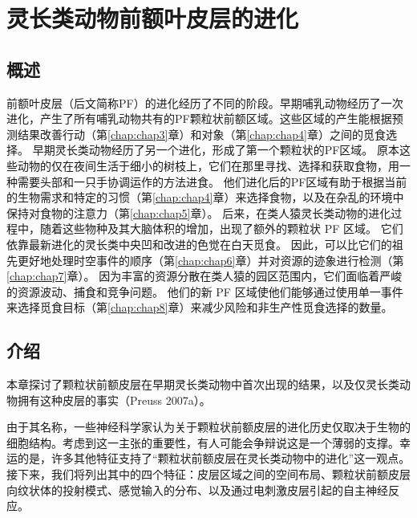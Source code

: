 \chapter{灵长类动物前额叶皮层的进化} \label{chap:chap2}

\section{概述}
前额叶皮层（后文简称PF）的进化经历了不同的阶段。早期哺乳动物经历了一次进化，产生了所有哺乳动物共有的PF颗粒状前额区域。这些区域的产生能根据预测结果改善行动（第\ref{chap:chap3}章）和对象（第\ref{chap:chap4}章）之间的觅食选择。
早期灵长类动物经历了另一个进化，形成了第一个颗粒状的PF区域。
原本这些动物的仅在夜间生活于细小的树枝上，它们在那里寻找、选择和获取食物，用一种需要头部和一只手协调运作的方法进食。
他们进化后的PF区域有助于根据当前的生物需求和特定的习惯（第\ref{chap:chap4}章）来选择食物，以及在杂乱的环境中保持对食物的注意力（第\ref{chap:chap5}章）。
后来，在类人猿灵长类动物的进化过程中，随着这些物种及其大脑体积的增加，出现了额外的颗粒状 PF 区域。
它们依靠最新进化的灵长类中央凹和改进的色觉在白天觅食。 因此，可以比它们的祖先更好地处理时空事件的顺序（第\ref{chap:chap6}章）并对资源的迹象进行检测（第\ref{chap:chap7}章）。
因为丰富的资源分散在类人猿的园区范围内，它们面临着严峻的资源波动、捕食和竞争问题。
他们的新 PF 区域使他们能够通过使用单一事件来选择觅食目标（第\ref{chap:chap8}章）来减少风险和非生产性觅食选择的数量。

\section{介绍}
本章探讨了颗粒状前额皮层在早期灵长类动物中首次出现的结果，以及仅灵长类动物拥有这种皮层的事实（Preuss 2007a）。

由于其名称，一些神经科学家认为关于颗粒状前额皮层的进化历史仅取决于生物的细胞结构。考虑到这一主张的重要性，有人可能会争辩说这是一个薄弱的支撑。幸运的是，许多其他特征支持了“颗粒状前额皮层在灵长类动物中的进化”这一观点。接下来，我们将列出其中的四个特征：皮层区域之间的空间布局、颗粒状前额皮层向纹状体的投射模式、感觉输入的分布、以及通过电刺激皮层引起的自主神经反应。

